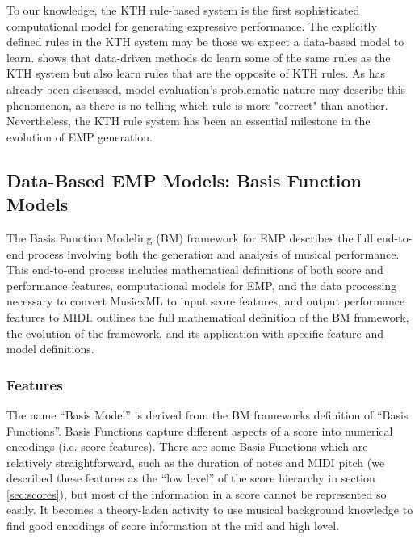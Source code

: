 
To our knowledge, the KTH rule-based system is the first sophisticated computational model for generating expressive performance. The explicitly defined rules in the KTH system may be those we expect a data-based model to learn. \citet{widmer2002machine} shows that data-driven methods do learn some of the same rules as the KTH system but also learn rules that are the opposite of KTH rules. As has already been discussed, model evaluation's problematic nature may describe this phenomenon, as there is no telling which rule is more "correct" than another. Nevertheless, the KTH rule system has been an essential milestone in the evolution of EMP generation. 

\subsection{Data-Based EMP Models: Basis Function Models}\label{sec:data-based}
The Basis Function Modeling (BM) framework for EMP describes the full end-to-end process involving both the generation and analysis of musical performance. This end-to-end process includes mathematical definitions of both score and performance features, computational models for EMP, and the data processing necessary to convert MusicxML to input score features, and output performance features to MIDI. \citet{eduardo2018computational} outlines the full mathematical definition of the BM framework, the evolution of the framework, and its application with specific feature and model definitions.

\subsubsection{Features}
The name ``Basis Model'' is derived from the BM frameworks definition of ``Basis Functions''. Basis Functions capture different aspects of a score into numerical encodings (i.e. score features). There are some Basis Functions which are relatively straightforward, such as the duration of notes and MIDI pitch (we described these features as the ``low level'' of the score hierarchy in section \ref{sec:scores}), but most of the information in a score cannot be represented so easily. It becomes a theory-laden activity to use musical background knowledge to find good encodings of score information at the mid and high level.

